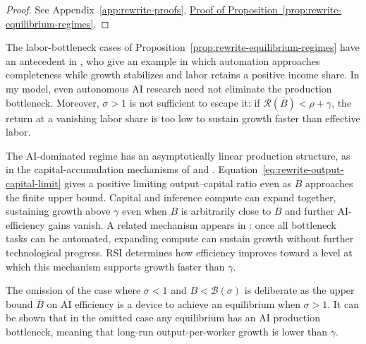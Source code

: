 \begin{proof}
See Appendix~\ref{app:rewrite-proofs},
\hyperref[proof:rewrite-equilibrium-regimes]{Proof of
Proposition~\ref*{prop:rewrite-equilibrium-regimes}}.
\end{proof}


The labor-bottleneck cases of Proposition~\ref{prop:rewrite-equilibrium-regimes}
have an antecedent in \citet[Section~9.2.2]{aghionjonesjones2019}, who give
an example in which automation approaches completeness while growth
stabilizes and labor retains a positive income share. In my model, even
autonomous AI research need not eliminate the production bottleneck.
Moreover, $\sigma>1$ is not sufficient to escape it: if
$\mathcal R(\overline B)<\rho+\gamma$, the return at a vanishing labor
share is too low to sustain growth faster than effective labor.

The AI-dominated regime has an asymptotically linear production structure,
as in the capital-accumulation mechanisms of
\citet{rebelo1991} and \citet{jonesmanuelli1990}.
Equation~\eqref{eq:rewrite-output-capital-limit} gives a positive limiting
output--capital ratio even as $B$ approaches the finite upper bound.
Capital and inference compute can expand together, sustaining growth above
$\gamma$ even when $B$ is arbitrarily close to $\overline B$ and further
AI-efficiency gains vanish. A related mechanism appears in
\citet{restrepo2025agi}: once all bottleneck tasks can be automated,
expanding compute can sustain growth without further technological progress.
RSI determines how efficiency improves
toward a level at which this mechanism supports growth faster than $\gamma$.

The omission of the case where $\sigma<1$ and $\overline B < \mathcal B(\sigma)$ is deliberate as the upper bound $\overline B$ on AI efficiency is a device to achieve an equilibrium when $\sigma>1$.
It can be shown that in the omitted case any equilibrium has an AI production bottleneck, meaning that long-run output-per-worker growth is lower than $\gamma$. %


